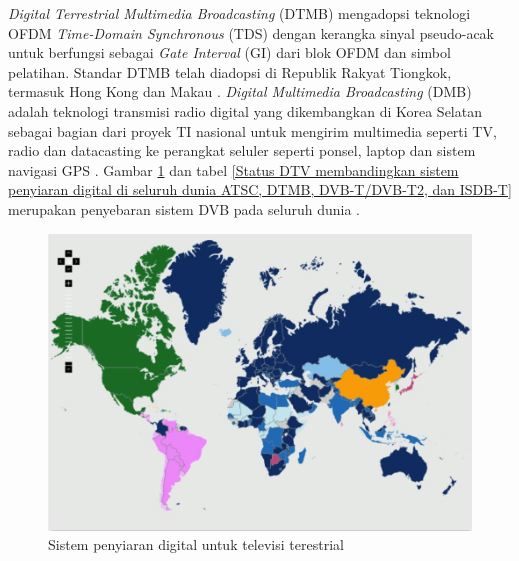 \textit{Digital Terrestrial Multimedia Broadcasting} (DTMB) mengadopsi teknologi OFDM \textit{Time-Domain Synchronous} (TDS) dengan kerangka sinyal pseudo-acak untuk berfungsi sebagai \textit{Gate Interval} (GI) dari blok OFDM dan simbol pelatihan. Standar DTMB telah diadopsi di Republik Rakyat Tiongkok, termasuk Hong Kong dan Makau \citep{Ong2010}. \textit{Digital Multimedia Broadcasting} (DMB) adalah teknologi transmisi radio digital yang dikembangkan di Korea Selatan sebagai bagian dari proyek TI nasional untuk mengirim multimedia seperti TV, radio dan datacasting ke perangkat seluler seperti ponsel, laptop dan sistem navigasi GPS \citep{Baek_2008}. Gambar \ref{Sistem penyiaran digital untuk televisi terestrial} dan tabel \ref{Status DTV membandingkan sistem penyiaran digital di seluruh dunia ATSC, DTMB, DVB-T/DVB-T2, dan ISDB-T} merupakan penyebaran sistem DVB pada seluruh dunia \citep{dtvstatus2017}.

\begin{figure}[H]
	\vspace{-0.1cm}
	\begin{center}
		\includegraphics[width=1\columnwidth]{bab2/Gambar/Sistem penyiaran digital untuk televisi terestrial.jpg}
	\end{center}
	\vspace{-0.2cm}
	\caption{Sistem penyiaran digital untuk televisi terestrial \citep{dtvstatus2017}}\label{Sistem penyiaran digital untuk televisi terestrial}
\end{figure}

